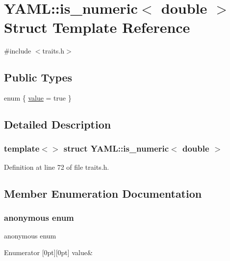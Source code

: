 \hypertarget{struct_y_a_m_l_1_1is__numeric_3_01double_01_4}{}\section{Y\+A\+ML\+::is\+\_\+numeric$<$ double $>$ Struct Template Reference}
\label{struct_y_a_m_l_1_1is__numeric_3_01double_01_4}


{\ttfamily \#include $<$traits.\+h$>$}

\subsection*{Public Types}
\begin{DoxyCompactItemize}
\item 
enum \{ \mbox{\hyperlink{struct_y_a_m_l_1_1is__numeric_3_01double_01_4_aa895851d22d6268fbd9816d4ab0669eea879717be0f8986cea1855d57378bf529}{value}} = true
 \}
\end{DoxyCompactItemize}


\subsection{Detailed Description}
\subsubsection*{template$<$$>$\newline
struct Y\+A\+M\+L\+::is\+\_\+numeric$<$ double $>$}



Definition at line 72 of file traits.\+h.



\subsection{Member Enumeration Documentation}
\mbox{\label{struct_y_a_m_l_1_1is__numeric_3_01double_01_4_aa895851d22d6268fbd9816d4ab0669ee}} 
\subsubsection{\texorpdfstring{anonymous enum}{anonymous enum}}
{\footnotesize\ttfamily anonymous enum}

\begin{DoxyEnumFields}{Enumerator}
[0pt][0pt]{}\mbox{\label{struct_y_a_m_l_1_1is__numeric_3_01double_01_4_aa895851d22d6268fbd9816d4ab0669eea879717be0f8986cea1855d57378bf529}} 
value&\\
\hline

\end{DoxyEnumFields}


